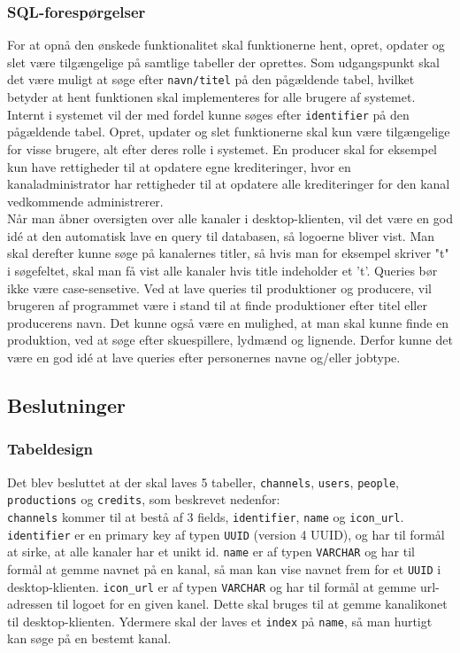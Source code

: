 \subsubsection{SQL-forespørgelser}
For at opnå den ønskede funktionalitet skal funktionerne hent, opret, opdater og slet være tilgængelige på samtlige tabeller der oprettes. Som udgangspunkt skal det være muligt at søge efter \texttt{navn/titel} på den pågældende tabel, hvilket betyder at hent funktionen skal implementeres for alle brugere af systemet. Internt i systemet vil der med fordel kunne søges efter \texttt{identifier} på den pågældende tabel. Opret, updater og slet funktionerne skal kun være tilgængelige for visse brugere, alt efter deres rolle i systemet. En producer skal for eksempel kun have rettigheder til at opdatere egne krediteringer, hvor en kanaladministrator har rettigheder til at opdatere alle krediteringer for den kanal vedkommende administrerer. \\


Når man åbner oversigten over alle kanaler i desktop-klienten, vil det være en god idé at den automatisk lave en query til databasen, så logoerne bliver vist. Man skal derefter kunne søge på kanalernes titler, så hvis man for eksempel skriver "t" i søgefeltet, skal man få vist alle kanaler hvis title indeholder et 't'. Queries bør ikke være case-sensetive. Ved at lave queries til produktioner og producere, vil brugeren af programmet være i stand til at finde produktioner efter titel eller producerens navn. Det kunne også være en mulighed, at man skal kunne finde en produktion, ved at søge efter skuespillere, lydmænd og lignende. Derfor kunne det være en god idé at lave queries efter personernes navne og/eller jobtype.

\subsection{Beslutninger}
\subsubsection{Tabeldesign}

Det blev besluttet at der skal laves 5 tabeller, \texttt{channels}, \texttt{users}, \texttt{people}, \texttt{productions} og \texttt{credits}, som beskrevet nedenfor:\\


\texttt{channels} kommer til at bestå af 3 fields, \texttt{identifier}, \texttt{name} og \texttt{icon\_url}. \texttt{identifier} er en primary key af typen \texttt{UUID} (version 4 UUID), og har til formål at sirke, at alle kanaler har et unikt id. \texttt{name} er af typen \texttt{VARCHAR} og har til formål at gemme navnet på en kanal, så man kan vise navnet frem for et \texttt{UUID} i desktop-klienten. \texttt{icon\_url} er af typen \texttt{VARCHAR} og har til formål at gemme url-adressen til logoet for en given kanel. Dette skal bruges til at gemme kanalikonet til desktop-klienten. Ydermere skal der laves et \texttt{index} på \texttt{name}, så man hurtigt kan søge på en bestemt kanal.\\


